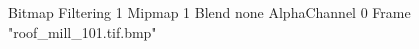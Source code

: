 {Bitmap
	{Filtering 1}
	{Mipmap 1}
	{Blend none}
	{AlphaChannel 0}
	{Frame "roof_mill_101.tif.bmp"}
}
